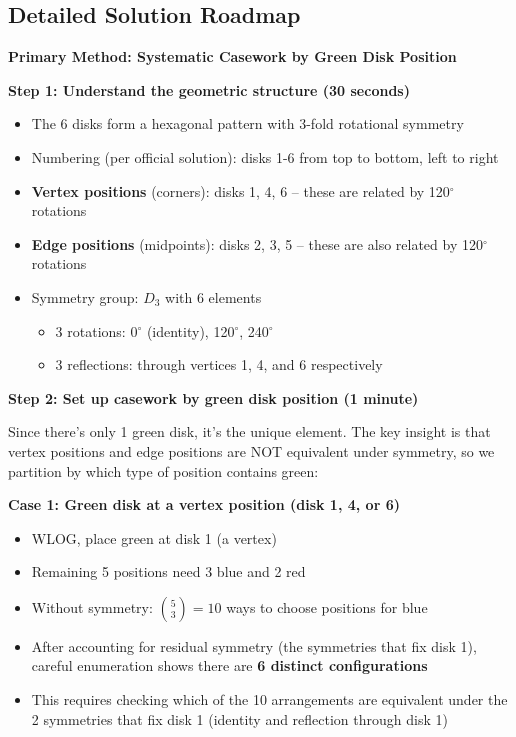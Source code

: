 \documentclass[11pt]{article}
\begin{document}
\begin{solutionbox}
\subsection*{Detailed Solution Roadmap}

\textbf{Primary Method: Systematic Casework by Green Disk Position}

\textbf{Step 1: Understand the geometric structure (30 seconds)}
\begin{itemize}
    \item The 6 disks form a hexagonal pattern with 3-fold rotational symmetry
    \item Numbering (per official solution): disks 1-6 from top to bottom, left to right
    \item \textbf{Vertex positions} (corners): disks 1, 4, 6 -- these are related by 120$^\circ$ rotations
    \item \textbf{Edge positions} (midpoints): disks 2, 3, 5 -- these are also related by 120$^\circ$ rotations
    \item Symmetry group: $D_3$ with 6 elements
    \begin{itemize}
        \item 3 rotations: 0$^\circ$ (identity), 120$^\circ$, 240$^\circ$
        \item 3 reflections: through vertices 1, 4, and 6 respectively
    \end{itemize}
\end{itemize}

\textbf{Step 2: Set up casework by green disk position (1 minute)}

Since there's only 1 green disk, it's the unique element. The key insight is that vertex positions and edge positions are NOT equivalent under symmetry, so we partition by which type of position contains green:

\textbf{Case 1: Green disk at a vertex position (disk 1, 4, or 6)}
\begin{itemize}
    \item WLOG, place green at disk 1 (a vertex)
    \item Remaining 5 positions need 3 blue and 2 red
    \item Without symmetry: $\binom{5}{3} = 10$ ways to choose positions for blue
    \item After accounting for residual symmetry (the symmetries that fix disk 1), careful enumeration shows there are \textbf{6 distinct configurations}
    \item This requires checking which of the 10 arrangements are equivalent under the 2 symmetries that fix disk 1 (identity and reflection through disk 1)
\end{itemize}


\end{solutionbox}
\end{document}
